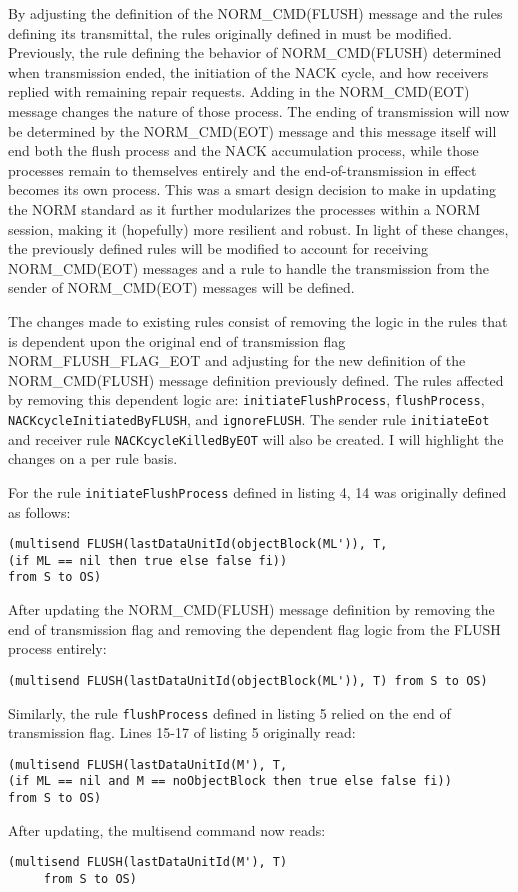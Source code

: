 \documentclass[10pt, journal]{IEEEtran}
\begin{document}
By adjusting the definition of the NORM\_CMD(FLUSH) message and the rules defining its transmittal, the rules originally defined in \cite{Lien2004} must be modified. Previously, the rule defining the behavior of NORM\_CMD(FLUSH) determined when transmission ended, the initiation of the NACK cycle, and how receivers replied with remaining repair requests. Adding in the NORM\_CMD(EOT) message changes the nature of those process. The ending of transmission will now be determined by the NORM\_CMD(EOT) message and this message itself will end both the flush process and the NACK accumulation process, while those processes remain to themselves entirely and the end-of-transmission in effect becomes its own process. This was a smart design decision to make in updating the NORM standard as it further modularizes the processes within a NORM session, making it (hopefully) more resilient and robust. In light of these changes, the previously defined rules will be modified to account for receiving NORM\_CMD(EOT) messages and a rule to handle the transmission from the sender of NORM\_CMD(EOT) messages will be defined.

The changes made to existing rules consist of removing the logic in the rules that is dependent upon the original end of transmission flag NORM\_FLUSH\_FLAG\_EOT and adjusting for the new definition of the NORM\_CMD(FLUSH) message definition previously defined. The rules affected by removing this dependent logic are: \texttt{initiateFlushProcess}, \texttt{flushProcess}, \texttt{NACKcycleInitiatedByFLUSH}, and \texttt{ignoreFLUSH}. The sender rule \texttt{initiateEot} and receiver rule \texttt{NACKcycleKilledByEOT} will also be created. I will highlight the changes on a per rule basis.

For the rule \texttt{initiateFlushProcess} defined in listing 4, 14 was originally defined as follows: 
\begin{lstlisting}
(multisend FLUSH(lastDataUnitId(objectBlock(ML')), T,
(if ML == nil then true else false fi)) 
from S to OS)
\end{lstlisting}

After updating the NORM\_CMD(FLUSH) message definition by removing the end of transmission flag and removing the dependent flag logic from the FLUSH process entirely:
\begin{lstlisting}
(multisend FLUSH(lastDataUnitId(objectBlock(ML')), T) from S to OS)
\end{lstlisting}

Similarly, the rule \texttt{flushProcess} defined in listing 5 relied on the end of transmission flag. Lines 15-17 of listing 5 originally read:
\begin{lstlisting}
(multisend FLUSH(lastDataUnitId(M'), T, 
(if ML == nil and M == noObjectBlock then true else false fi)) 
from S to OS)
\end{lstlisting}
\noindent
After updating, the multisend command now reads:
\begin{lstlisting}
(multisend FLUSH(lastDataUnitId(M'), T) 
     from S to OS)
\end{lstlisting}
\end{document}
